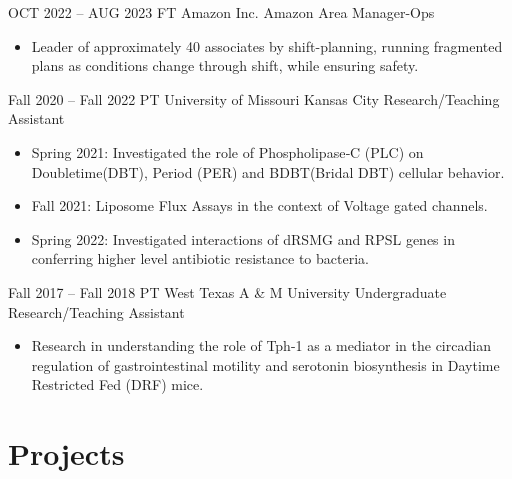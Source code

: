 \documentclass[
	10pt, %
]{FreemanCV_MOD}
\begin{document}
\begin{paracol}{2}

\jobentry
	{ OCT 2022 --  AUG 2023} %
	{FT} %
	{Amazon Inc.} %
	{Amazon Area Manager-Ops} %
	\jobdetails
	\begin{itemize}
	\item Leader of approximately 40 associates by shift-planning, running fragmented
plans as conditions change through shift, while ensuring safety.
	 \end{itemize}%
	

\jobentry
	{Fall 2020 -- Fall 2022} %
	{PT} %
	{University of Missouri Kansas City} %
	{Research/Teaching Assistant} %
	\jobdetails
	\begin{itemize}
	\item Spring 2021: Investigated the role of Phospholipase‑C (PLC) on Doubletime(DBT), Period (PER) and BDBT(Bridal DBT) cellular behavior.
	\item Fall 2021: Liposome Flux Assays in the context of Voltage gated channels.
	\item Spring 2022: Investigated interactions of dRSMG and RPSL genes in conferring higher level antibiotic resistance to bacteria.
	 \end{itemize}%


\jobentry
	{Fall 2017 -- Fall 2018} %
	{PT} %
	{West Texas A \& M University} %
	{Undergraduate Research/Teaching Assistant} %
	\jobdetails
	\begin{itemize}
	\item Research in understanding the role of Tph-1 as a mediator in the circadian regulation of gastrointestinal motility and serotonin biosynthesis in Daytime Restricted Fed (DRF) mice.
	 \end{itemize}%


\section{Projects}{\faClipboard}


\end{paracol}
\end{document}
